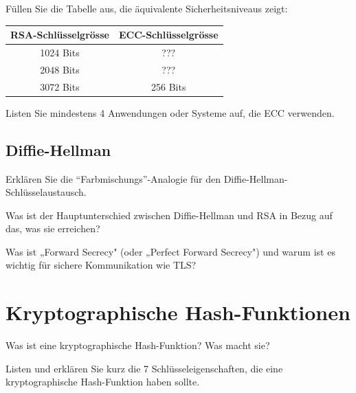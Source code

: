 \documentclass[11pt,a4paper]{report}
\begin{document}
\begin{ex}
Füllen Sie die Tabelle aus, die äquivalente Sicherheitsniveaus zeigt:

\begin{center}
\begin{tabular}{|c|c|}
\hline
\textbf{RSA-Schlüsselgrösse} & \textbf{ECC-Schlüsselgrösse} \\
\hline
1024 Bits & ??? \\
2048 Bits & ??? \\
3072 Bits & 256 Bits \\
\hline
\end{tabular}
\end{center}
\end{ex}

\begin{ex}
Listen Sie mindestens 4 Anwendungen oder Systeme auf, die ECC verwenden.
\end{ex}

\subsection{Diffie-Hellman}

\begin{ex}
Erklären Sie die ``Farbmischungs''-Analogie für den Diffie-Hellman-Schlüsselaustausch.
\end{ex}

\begin{ex}
Was ist der Hauptunterschied zwischen Diffie-Hellman und RSA in Bezug auf das, was sie erreichen?
\end{ex}

\begin{ex}
Was ist „Forward Secrecy" (oder „Perfect Forward Secrecy") und warum ist es wichtig für sichere Kommunikation wie TLS?
\end{ex}

\section{Kryptographische Hash-Funktionen}

\begin{ex}
Was ist eine kryptographische Hash-Funktion? Was macht sie?
\end{ex}

\begin{ex}
Listen und erklären Sie kurz die 7 Schlüsseleigenschaften, die eine kryptographische Hash-Funktion haben sollte.
\end{ex}
\end{document}

